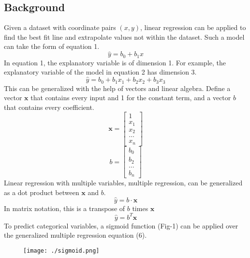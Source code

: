\documentclass[11pt]{article}
\begin{document}
\begin{multicols}{2}
\section{Background}
\label{sec:org8d2f88e}
Given a dataset with coordinate pairs $(x, y)$, linear regression can be applied to find 
the best fit line and extrapolate values not within the dataset. Such a model can take the form of equation
1.
\begin{equation}
\label{eq:standard}
\hat{y} = b_0 + b_1 x
\end{equation}
In equation 1, the explanatory variable is of dimension 1. For example,
the explanatory variable of the model in equation 2 has dimension 3.
\begin{equation}
\hat{y} = b_0 + b_1 x_1 + b_2 x_2 + b_3 x_3
\end{equation}
This can be generalized with the help of vectors and linear algebra. Define a vector
$\textbf{x}$ that contains every input and 1 for the constant term, and a vector $b$ that contains
every coefficient. 
\begin{equation}
\textbf{x} = \begin{bmatrix}
1 \\
x_1 \\
x_2 \\
\dots \\
x_n
\end{bmatrix}
\end{equation}
\begin{equation}
b = \begin{bmatrix}
b_0 \\
b_2 \\
\dots \\
b_{n}
\end{bmatrix}
\end{equation}
Linear regression with multiple variables, multiple regression, can be generalized as a 
dot product between $\textbf{x}$ and $b$.
\begin{equation}
\hat{y} = b \cdot \textbf{x}
\end{equation}
In matrix notation, this is a transpose of $b$ times $\textbf{x}$
\begin{equation}
\hat{y} = b^T \textbf{x}
\end{equation}
To predict categorical variables, a sigmoid function (Fig-1) can be applied over the generalized multiple regression equation (6).
\begin{figure}[H]
\centering
\texttt{[image: ./sigmoid.png]}
\caption{\label{fig:posvsfreq}
}
\end{figure}
\end{multicols}
\end{document}
